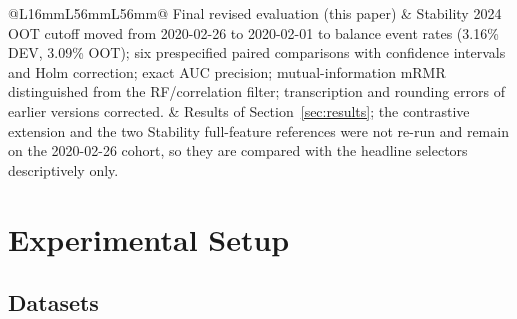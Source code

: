 \documentclass[final,5p,twocolumn]{elsarticle}
\begin{document}
\begin{table}[htbp]
\begin{threeparttable}
\begin{tabular}{@{}L{16mm}L{56mm}L{56mm}@{}}
\addlinespace
Final revised evaluation (this paper) & Stability 2024 OOT cutoff moved from 2020-02-26 to 2020-02-01 to balance event rates (3.16\% DEV, 3.09\% OOT); six prespecified paired comparisons with confidence intervals and Holm correction; exact AUC precision; mutual-information mRMR distinguished from the RF/correlation filter; transcription and rounding errors of earlier versions corrected. & Results of Section~\ref{sec:results}; the contrastive extension and the two Stability full-feature references were not re-run and remain on the 2020-02-26 cohort, so they are compared with the headline selectors descriptively only. \\
\bottomrule
\end{tabular}
\end{threeparttable}
\end{table}


\section{Experimental Setup}
\label{sec:experimental_setup}

\subsection{Datasets}
\label{subsec:datasets}
\end{document}
